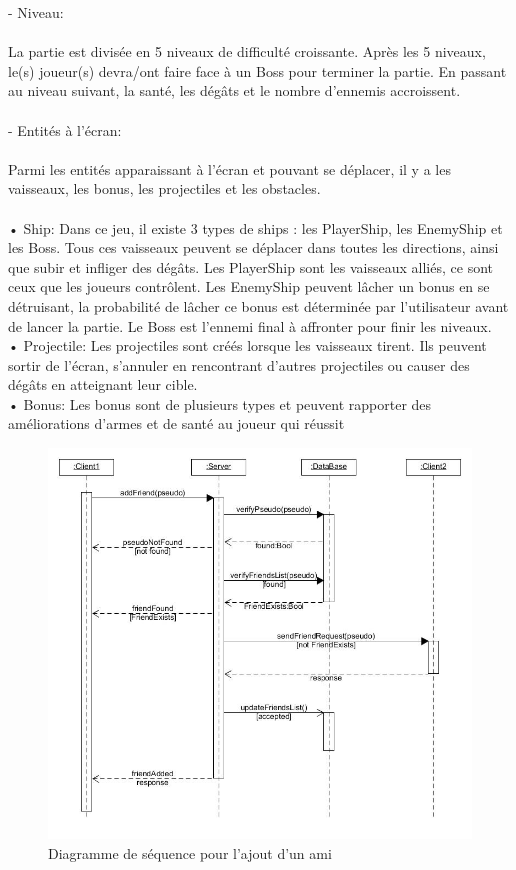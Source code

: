 \documentclass[a4paper,12pt]{article}
\begin{document}
- Niveau:\\ \\
La partie est divisée en 5 niveaux de difficulté croissante. Après les 5 niveaux, le(s) joueur(s) 
devra/ont faire face à un Boss pour terminer la partie. En passant au niveau suivant, la santé, 
les dégâts et le nombre d’ennemis accroissent.\\ \\

- Entités à l’écran:\\ \\
Parmi les entités apparaissant à l’écran et pouvant se déplacer, il y a les vaisseaux, les bonus, 
les projectiles et les obstacles.\\ \\
• Ship: Dans ce jeu, il existe 3 types de ships : les PlayerShip, les EnemyShip et les 
Boss. Tous ces vaisseaux peuvent se déplacer dans toutes les directions, ainsi que 
subir et infliger des dégâts. Les PlayerShip sont les vaisseaux alliés, ce sont ceux que 
les joueurs contrôlent. Les EnemyShip peuvent lâcher un bonus en se détruisant, la 
probabilité de lâcher ce bonus est déterminée par l’utilisateur avant de lancer la partie. 
Le Boss est l’ennemi final à affronter pour finir les niveaux.\\ 

• Projectile: Les projectiles sont créés lorsque les vaisseaux tirent. Ils peuvent sortir de 
l’écran, s’annuler en rencontrant d’autres projectiles ou causer des dégâts en atteignant 
leur cible.\\

• Bonus: Les bonus sont de plusieurs types et peuvent rapporter des améliorations 
d’armes et de santé au joueur qui réussit 

\newpage
\begin{figure}[hbtp]
\centering
\includegraphics[scale=0.5]{images/add_friend.jpg}
\caption{Diagramme de séquence pour l'ajout d'un ami }
\end{figure}
\end{document}

